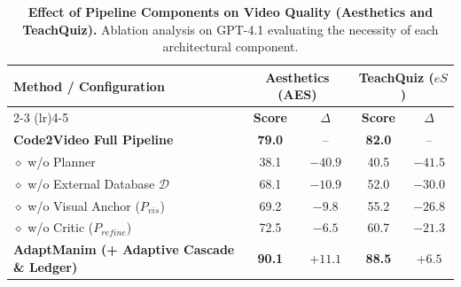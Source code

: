 \begin{table}[h]
\centering
\small
\caption{\textbf{Effect of Pipeline Components on Video Quality (Aesthetics and TeachQuiz).} 
Ablation analysis on GPT-4.1 evaluating the necessity of each architectural component.}
\label{tab:quality_ablation}
\begin{tabular}{lcccc}
\toprule
\textbf{Method / Configuration} & \multicolumn{2}{c}{\textbf{Aesthetics (AES)}} & \multicolumn{2}{c}{\textbf{TeachQuiz ($eS$)}} \\
\cmidrule(lr){2-3} \cmidrule(lr){4-5}
& \textbf{Score} & $\Delta$ & \textbf{Score} & $\Delta$ \\
\midrule
\textbf{Code2Video Full Pipeline} & \textbf{79.0} & -- & \textbf{82.0} & -- \\
\quad $\diamond$ w/o Planner & 38.1 & $-40.9$ & 40.5 & $-41.5$ \\
\quad $\diamond$ w/o External Database $\mathcal{D}$ & 68.1 & $-10.9$ & 52.0 & $-30.0$ \\
\quad $\diamond$ w/o Visual Anchor ($P_{vis}$) & 69.2 & $-9.8$ & 55.2 & $-26.8$ \\
\quad $\diamond$ w/o Critic ($P_{refine}$) & 72.5 & $-6.5$ & 60.7 & $-21.3$ \\
\midrule
\textbf{AdaptManim (+ Adaptive Cascade \& Ledger)} & \textbf{90.1} & $+11.1$ & \textbf{88.5} & $+6.5$ \\
\bottomrule
\end{tabular}
\end{table}
